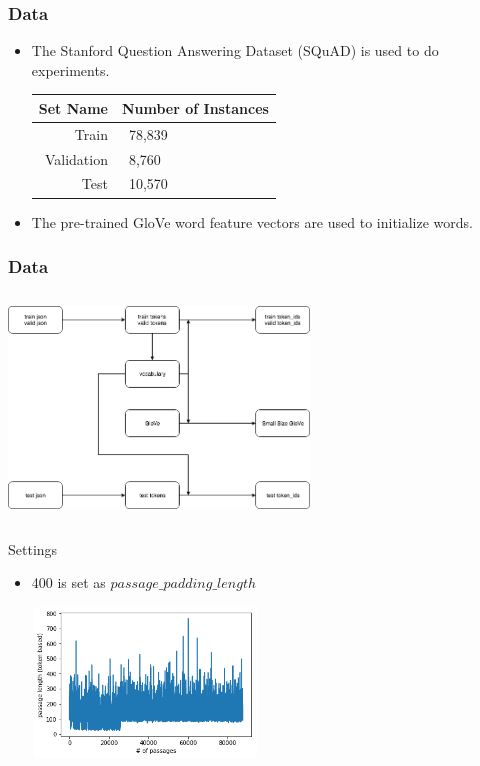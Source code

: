 \documentclass{beamer}
\begin{document}
\begin{frame} \frametitle{Data}
    \begin{itemize}
        \item The Stanford Question Answering Dataset (SQuAD) is used to do experiments.
        \begin{table}[htbp]\centering
          \begin{tabular}{|r|l|} \hline
            Set Name & Number of Instances \\ \hline\hline
            Train & \ 78,839 \\
            Validation & \ 8,760 \\
            Test & \ 10,570 \\ \hline
          \end{tabular}
        \end{table}
        \item The pre-trained GloVe word feature vectors are used to initialize words.
    \end{itemize}
\end{frame}

\begin{frame}\frametitle{Data}
    \begin{center}
        \includegraphics[width=8cm, height=6cm]{figures/data.png}
    \end{center}
\end{frame}

\begin{frame}{Settings}
    \begin{itemize}
        \item 400 is set as $passage\_padding\_length$
            \begin{center}
                \includegraphics[width=6cm, height=4cm]{figures/passage_length.png}
            \end{center}
    \end{itemize}
\end{frame}
\end{document}
